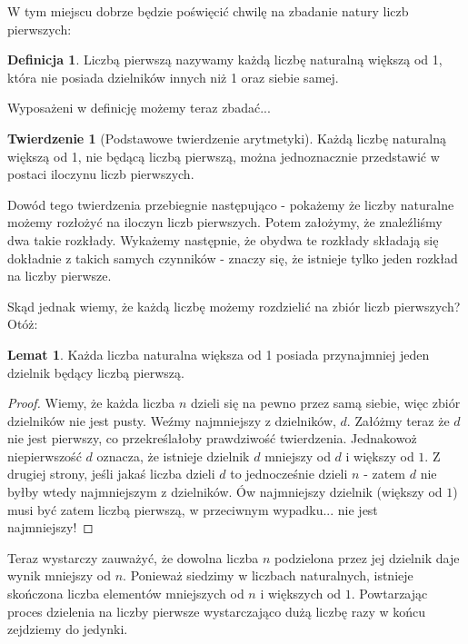 \documentclass[11pt]{article}
\theoremstyle{definition}
\numberwithin{zad}{section}
\newtheorem{theorem}{Twierdzenie}
\newtheorem{definition}{Definicja}
\newtheorem{lemma}{Lemat}
\begin{document}
W tym miejscu dobrze będzie poświęcić chwilę na zbadanie natury liczb pierwszych:

\begin{definition}
Liczbą pierwszą nazywamy każdą liczbę naturalną większą od 1, która nie posiada dzielników innych niż 1 oraz siebie samej.
\end{definition}

Wyposażeni w definicję możemy teraz zbadać...

\begin{theorem}[Podstawowe twierdzenie arytmetyki] Każdą liczbę naturalną większą od 1, nie będącą liczbą pierwszą, można jednoznacznie przedstawić w postaci iloczynu liczb pierwszych.
\end{theorem}

Dowód tego twierdzenia przebiegnie następująco - pokażemy że liczby naturalne możemy rozłożyć na iloczyn liczb pierwszych. Potem założymy, że znaleźliśmy dwa takie rozkłady. Wykażemy następnie, że obydwa te rozkłady składają się dokładnie z takich samych czynników - znaczy się, że istnieje tylko jeden rozkład na liczby pierwsze.

Skąd jednak wiemy, że każdą liczbę możemy rozdzielić na zbiór liczb pierwszych? Otóż:

\begin{lemma}
Każda liczba naturalna większa od 1 posiada przynajmniej jeden dzielnik będący liczbą pierwszą.
\end{lemma}
\begin{proof}
Wiemy, że każda liczba $n$ dzieli się na pewno przez samą siebie, więc zbiór dzielników nie jest pusty. Weźmy najmniejszy z dzielników, $d$. Załóżmy teraz że $d$ nie jest pierwszy, co przekreślałoby prawdziwość twierdzenia. Jednakowoż niepierwszość $d$ oznacza, że istnieje dzielnik $d$ mniejszy od $d$ i większy od $1$. Z drugiej strony, jeśli jakaś liczba dzieli $d$ to jednocześnie dzieli $n$ - zatem $d$ nie byłby wtedy najmniejszym z dzielników. Ów najmniejszy dzielnik (większy od $1$) musi być zatem liczbą pierwszą, w przeciwnym wypadku... nie jest najmniejszy!
\end{proof}

Teraz wystarczy zauważyć, że dowolna liczba $n$ podzielona przez jej dzielnik daje wynik mniejszy od $n$. Ponieważ siedzimy w liczbach naturalnych, istnieje skończona liczba elementów mniejszych od $n$ i większych od $1$. Powtarzając proces dzielenia na liczby pierwsze wystarczająco dużą liczbę razy w końcu zejdziemy do jedynki.
\end{document}
